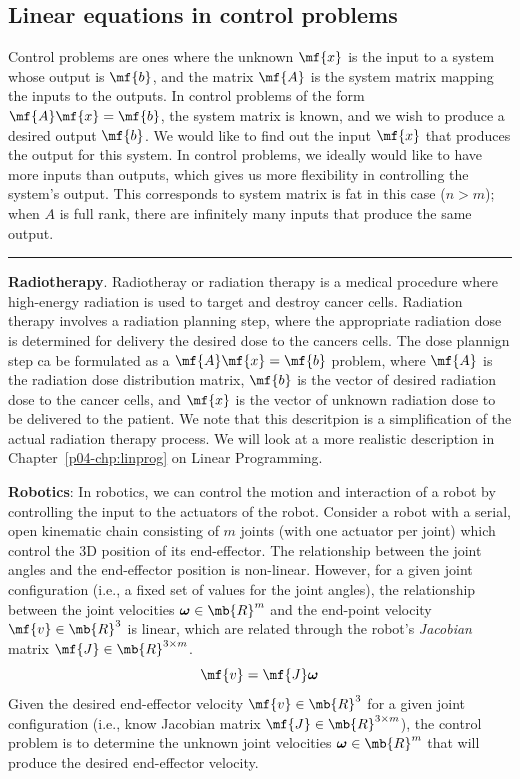\subsection{Linear equations in control problems}
Control problems are ones where the unknown $\mf{x}$ is the input to a system whose output is $\mf{b}$, and the matrix $\mf{A}$ is the system matrix mapping the inputs to the outputs. In control problems of the form $\mf{A}\mf{x} = \mf{b}$, the system matrix is known, and we wish to produce a desired output $\mf{b}$. We would like to find out the input $\mf{x}$ that produces the output for this system. In control problems, we ideally would like to have more inputs than outputs, which gives us more flexibility in controlling the system's output. This corresponds to system matrix is fat in this case ($n > m$); when $A$ is full rank, there are infinitely many inputs that produce the same output.

\begin{boxedstuff}
    \vspace{4mm}
    \hrule
    \begin{example}
        \textbf{Radiotherapy}. Radiotheray or radiation therapy is a medical procedure where high-energy radiation is used to target and destroy cancer cells. Radiation therapy involves a radiation planning step, where the appropriate radiation dose is determined for delivery the desired dose to the cancers cells. The dose plannign step ca be formulated as a $\mf{A}\mf{x} = \mf{b}$ problem, where $\mf{A}$ is the radiation dose distribution matrix, $\mf{b}$ is the vector of desired radiation dose to the cancer cells, and $\mf{x}$ is the vector of unknown radiation dose to be delivered to the patient. We note that this descritpion is a simplification of the actual radiation therapy process. We will look at a more realistic description in Chapter~\ref{p04-chp:linprog} on Linear Programming.
    \end{example}
    \begin{example}
        \textbf{Robotics}: In robotics, we can control the motion and interaction of a robot by controlling the input to the actuators of the robot. Consider a robot with a serial, open kinematic chain consisting of $m$ joints (with one actuator per joint) which control the 3D position of its end-effector. The relationship between the joint angles and the end-effector position is non-linear. However, for a given joint configuration (i.e., a fixed set of values for the joint angles), the relationship between the joint velocities $\bm{\omega} \in \mb{R}^m$ and the end-point velocity $\mf{v} \in \mb{R}^3$ is linear, which are related through the robot's \textit{Jacobian} matrix $\mf{J} \in \mb{R}^{3 \times m}$.
        \[  \mf{v} = \mf{J} \bm{\omega} \]
        Given the desired end-effector velocity $\mf{v}\in \mb{R}^3$ for a given joint configuration (i.e., know Jacobian matrix $\mf{J} \in \mb{R}^{3 \times m}$), the control problem is to determine the unknown joint velocities $\bm{\omega} \in \mb{R}^m$ that will produce the desired end-effector velocity.
    \end{example}
\end{boxedstuff}


